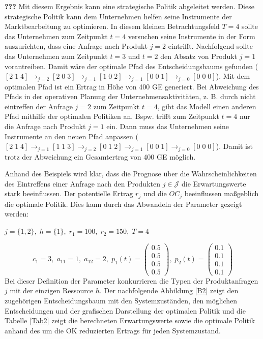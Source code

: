 \textbf{???} Mit diesem Ergebnis kann eine strategische Politik abgeleitet werden. Diese strategische Politik kann dem Unternehmen helfen seine Instrumente der Marktbearbeitung zu optimieren. In diesem kleinen Betrachtungsfeld $T=4$ sollte das Unternehmen zum Zeitpunkt $t=4$ versuchen seine Instrumente in der Form auszurichten, dass eine Anfrage nach Produkt $j=2$ eintrifft. Nachfolgend sollte das Unternehmen zum Zeitpunkt $t=3$ und $t=2$ den Absatz von Produkt $j=1$ vorantreiben. Damit wäre der optimale Pfad des Entscheidungsbaums gefunden ($[2\;1\;4] \rightarrow_{j=2} [2\;0\;3] \rightarrow_{j=1} [1\;0\;2] \rightarrow_{j=1} [0\;0\;1]\rightarrow_{j=0} [0\;0\;0]$). Mit dem optimalen Pfad ist ein Ertrag in Höhe von 400 GE generiert. Bei Abweichung des Pfads in der operativen Planung der Unternehmensaktivitäten, z. B. durch nicht eintreffen der Anfrage $j=2$ zum Zeitpunkt $t=4$, gibt das Modell einen anderen Pfad mithilfe der optimalen Politiken an. Bspw. trifft zum Zeitpunkt $t=4$ nur die Anfrage nach Produkt $j=1$ ein. Dann muss das Unternehmen seine Instrumente an den neuen Pfad anpassen ($[2\;1\;4] \rightarrow_{j=1} [1\;1\;3] \rightarrow_{j=2} [0\;1\;2] \rightarrow_{j=1} [0\;0\;1]\rightarrow_{j=0} [0\;0\;0]$). Damit ist trotz der Abweichung ein Gesamtertrag von 400 GE möglich.

Anhand des Beispiels wird klar, dass die Prognose über die Wahrscheinlichkeiten des Eintreffens einer Anfrage nach den Produkten $j\in\mathcal{J}$ die Erwartungswerte stark beeinflussen. Der potentielle Ertrag $r_{j}$ und die $OC_{j}$ beeinflussen maßgeblich die optimale Politik. Dies kann durch das Abwandeln der Parameter gezeigt werden:
\begin{center}
$j = \{1, 2\}, \; h = \{1\}, \; r_{1} = 100, \; r_{2} = 150, \; T=4$
\end{center}
\[
    c_{1}= 3, \;
    a_{11}=1, \;
     a_{12}=2, \;
     p_{1}(t)=\begin{pmatrix} 0.5\\ 0.5\\ 0.5\\ 0.5  \end{pmatrix}, \;
     p_{2}(t)=\begin{pmatrix} 0.1\\ 0.1\\ 0.1\\ 0.1  \end{pmatrix}
  \]
Bei dieser Definition der Parameter konkurrieren die Typen der Produktanfragen $j$ mit der einzigen Ressource $h$. Der nachfolgende Abbildung \ref{B2} zeigt den zugehörigen Entscheidungsbaum mit den Systemzuständen, den möglichen Entscheidungen und der grafischen Darstellung der optimalen Politik und die Tabelle \ref{Tab2} zeigt die berechneten Erwartungswerte sowie die optimale Politik anhand des um die OK reduzierten Ertrags für jeden Systemzustand.

